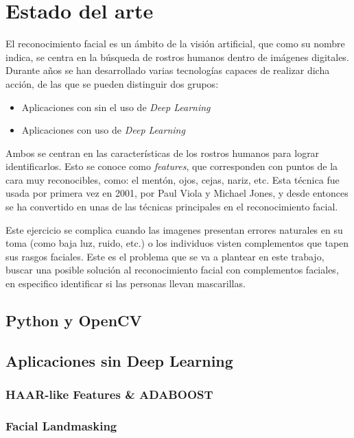 
\chapter{Estado del arte}

El reconocimiento facial es un ámbito de la visión artificial, que como su nombre indica, se centra en la búsqueda de rostros humanos dentro de imágenes digitales. Durante años se han desarrollado varias tecnologías capaces de realizar dicha acción, de las que se pueden distinguir dos grupos:

\begin{itemize}
	\item Aplicaciones con sin el uso de \textit{Deep Learning}
	\item Aplicaciones con uso de \textit{Deep Learning}
\end{itemize}

Ambos se centran en las características de los rostros humanos para lograr identificarlos. Esto se conoce como \textit{features}, que corresponden con puntos de la cara muy reconocibles, como: el mentón, ojos, cejas, nariz, etc. Esta técnica fue usada por primera vez en 2001, por Paul Viola y Michael Jones, y desde entonces se ha convertido en unas de las técnicas principales en el reconocimiento facial.

Este ejercicio se complica cuando las imagenes presentan errores naturales en su toma (como baja luz, ruido, etc.) o los individuos visten complementos que tapen sus rasgos faciales. Este es el problema que se va a plantear en este trabajo, buscar una posible solución al reconocimiento facial con complementos faciales, en especifico identificar si las personas llevan mascarillas.

\section{Python y OpenCV}


\section{Aplicaciones sin Deep Learning}


\subsection*{HAAR-like Features \& ADABOOST}


\subsection*{Facial Landmasking}


